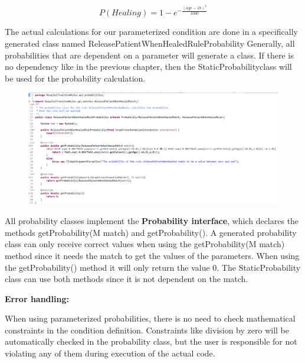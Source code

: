\centering

 $$ P(Healing) =   1 - e^{ - \frac{(age - 18)^{2}}{1000}} $$
 
 \raggedright

The actual calculations for our parameterized condition are done in a specifically generated class named \textsf{ReleasePatientWhenHealedRuleProbability}
Generally, all probabilities that are dependent on a parameter will generate a class. If there is no dependency like in the previous chapter, then the \textsf{StaticProbabilityclass} will be used for the probability calculation.\newline

\begin{figure}[h]
    \centering
    \includegraphics[scale=0.4]{pictures/probabilityClass.png}
    \caption{}
    \label{Probability Class in HospitalTransformRules.api.probabilities}
\end{figure}


All probability classes implement the \textbf{Probability interface}, which declares the methods \textsf{getProbability(M match)} and \textsf{getProbability()}. A generated probability class can only receive correct values when using the \textsf{getProbability(M match)} method since it needs the match to get the values of the parameters. When using the \textsf{getProbability()} method it will only return the value 0. The \textsf{StaticProbability} class can use both methods since it is not dependent on the match.\newline

\textbf{Error handling:}

When using parameterized probabilities, there is no need to check mathematical constraints in the condition definition. Constraints like division by zero will be automatically checked in the probability class, but the user is responsible for not violating any of them during execution of the actual code.\newline

